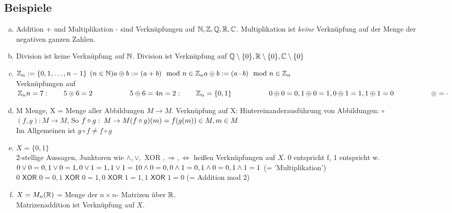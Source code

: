 \subsection{Beispiele}\label{sec:1.2}
\begin{enumerate}[a)]
\item Addition $+$ und Multiplikation $\cdot$ sind Verknüpfungen auf $\mathbb{N}, \mathbb{Z}, \mathbb{Q}, \mathbb{R}, \mathbb{C}$.
Multiplikation ist \emph{keine} Verknüpfung auf der Menge der negativen ganzen Zahlen.
\item Division ist keine Verknüpfung auf $\mathbb{N}$. Division ist Verknüpfung auf $\mathbb{Q} \setminus \{0\}, \mathbb{R} \setminus \{0\}, \mathbb{C} \setminus \{0\}$
\item $\mathbb{Z}_n : = \{ 0,1,\ldots,n-1 \}$ \hfill $(n \in \mathbb{N})\\
a \oplus b : = (a + b) \mod n \in \mathbb{Z}_n\\
a \circledcirc b := (a \cdot b) \mod n \in \mathbb{Z}_n$\\
Verknüpfungen auf $\mathbb{Z}_n\\
n = 7:\qquad 5 \circledcirc 6 = 2\\
\phantom{n = 7::}\qquad 5 \oplus 6 = 4\\
n = 2:\qquad \mathbb{Z}_n = \{0,1\}\\
\phantom{n = 2::}\qquad0 \oplus 0 = 0, 1 \oplus 0 = 1,0 \oplus 1 = 1, 1 \oplus 1 = 0\\
\phantom{n = 2::}\qquad\circledcirc = \cdot$
\item M Menge, X = Menge aller Abbildungen $M \longrightarrow M$. Verknüpfung auf X: Hintereinanderausführung von Abbildungen: $\circ$\\
$(f, g): M \longrightarrow M$, So $f\circ g:\:M \to M\\
(f \circ g)(m) = f(g(m)) \in M, m \in M$\\
Im Allgemeinen ist $g \circ f \ne f \circ g$
\item $X = \{0,1\}$\\
2-stellige Aussagen, Junktoren wie $\land,\lor,$\textsf{ XOR }$,\Rightarrow,\Leftrightarrow$ hei\ss en Verknüpfungen auf $X$.
0 entspricht f, 1 entspricht w.\\
$0 \lor 0 = 0, 1 \lor 0 = 1, 0 \lor 1 = 1, 1 \lor 1 = 1\\
0 \land 0 = 0, 0 \land 1 = 0, 1 \land 0 = 0, 1 \land 1 =1$ (= 'Multiplikation')\\
$0 \textsf{ XOR } 0 = 0, 1 \textsf{ XOR } 0 = 1, 0 \textsf{ XOR } 1 = 1, 1 \textsf{ XOR } 1 = 0$ (= Addition mod 2)
\item $X = M_n(\mathbb{R})$ = Menge der  $n \times n$- Matrizen über $\mathbb{R}$.\\ Matrizenaddition ist Verknüpfung auf $X$.\\

\end{enumerate}
